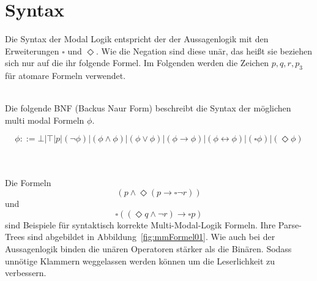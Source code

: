 
\section{Syntax} %
\label{sec:syntax}
Die Syntax der Modal Logik entspricht der der Aussagenlogik mit den Erweiterungen $\square$ und $\Diamond$. 
Wie die Negation sind diese unär, das heißt sie beziehen sich nur auf die ihr folgende Formel. Im Folgenden werden die Zeichen $p, q, r, p_3$ für atomare Formeln verwendet.\cite[S.307f]{huth2004logic}\\
\\
\begin{definition}
	\label{def:syntax}
	Die folgende BNF (Backus Naur Form) beschreibt die Syntax der möglichen multi modal Formeln $\phi$.

	\begin{equation}
		\label{eqn:bnf}
		\phi ::= \bot|\top|p|(\neg\phi)|(\phi\wedge\phi)|(\phi\vee\phi)|(\phi\rightarrow\phi)|
		(\phi\leftrightarrow\phi)|(\square\phi)|(\Diamond\phi)
	\end{equation}
\end{definition}
\cite[S.307]{huth2004logic}
\\
\\
Die Formeln 
\begin{equation}
	(p \wedge \Diamond(p \rightarrow \square \neg r))
\end{equation} 
und 
\begin{equation}
	\square((\Diamond q \wedge \neg r) \rightarrow \square p )	
\end{equation}
sind Beispiele für syntaktisch korrekte Multi-Modal-Logik Formeln. Ihre Parse-Trees sind abgebildet in Abbildung~\ref{fig:mmFormel01}.
Wie auch bei der Aussagenlogik binden die unären Operatoren stärker als die Binären.
Sodass unnötige Klammern weggelassen werden können um die Leserlichkeit zu verbessern.\\
\\

